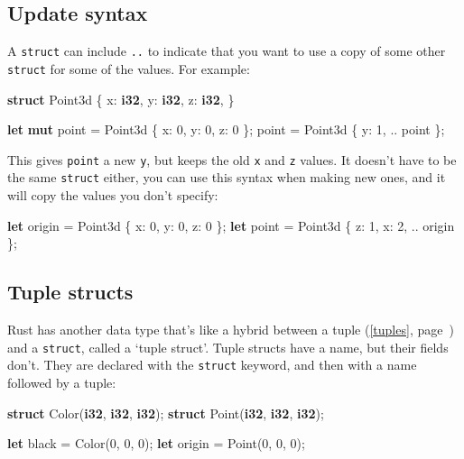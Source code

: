 \documentclass[a4paper,]{book}
\renewcommand*{\hyperref}[2][\ar]{%
  \def\ar{#2}%
  #2 (\autoref{#1}, page~\pageref{#1})}
\newenvironment{Shaded}{\begin{snugshade}}{\end{snugshade}}
\newcommand{\KeywordTok}[1]{\textcolor[rgb]{0.13,0.29,0.53}{\textbf{{#1}}}}
\newcommand{\DecValTok}[1]{\textcolor[rgb]{0.00,0.00,0.81}{{#1}}}
\newcommand{\NormalTok}[1]{{#1}}
\begin{document}
\subsection{Update syntax}\label{update-syntax}

A \texttt{struct} can include \texttt{..} to indicate that you want to
use a copy of some other \texttt{struct} for some of the values. For
example:

\begin{Shaded}
\begin{Highlighting}[]
\KeywordTok{struct} \NormalTok{Point3d \{}
    \NormalTok{x: }\KeywordTok{i32}\NormalTok{,}
    \NormalTok{y: }\KeywordTok{i32}\NormalTok{,}
    \NormalTok{z: }\KeywordTok{i32}\NormalTok{,}
\NormalTok{\}}

\KeywordTok{let} \KeywordTok{mut} \NormalTok{point = Point3d \{ x: }\DecValTok{0}\NormalTok{, y: }\DecValTok{0}\NormalTok{, z: }\DecValTok{0} \NormalTok{\};}
\NormalTok{point = Point3d \{ y: }\DecValTok{1}\NormalTok{, .. point \};}
\end{Highlighting}
\end{Shaded}

This gives \texttt{point} a new \texttt{y}, but keeps the old \texttt{x}
and \texttt{z} values. It doesn't have to be the same \texttt{struct}
either, you can use this syntax when making new ones, and it will copy
the values you don't specify:

\begin{Shaded}
\begin{Highlighting}[]
\KeywordTok{let} \NormalTok{origin = Point3d \{ x: }\DecValTok{0}\NormalTok{, y: }\DecValTok{0}\NormalTok{, z: }\DecValTok{0} \NormalTok{\};}
\KeywordTok{let} \NormalTok{point = Point3d \{ z: }\DecValTok{1}\NormalTok{, x: }\DecValTok{2}\NormalTok{, .. origin \};}
\end{Highlighting}
\end{Shaded}

\subsection{Tuple structs}\label{tuple-structs}

Rust has another data type that's like a hybrid between a
\hyperref[tuples]{tuple} and a \texttt{struct}, called a `tuple struct'.
Tuple structs have a name, but their fields don't. They are declared
with the \texttt{struct} keyword, and then with a name followed by a
tuple:

\begin{Shaded}
\begin{Highlighting}[]
\KeywordTok{struct} \NormalTok{Color(}\KeywordTok{i32}\NormalTok{, }\KeywordTok{i32}\NormalTok{, }\KeywordTok{i32}\NormalTok{);}
\KeywordTok{struct} \NormalTok{Point(}\KeywordTok{i32}\NormalTok{, }\KeywordTok{i32}\NormalTok{, }\KeywordTok{i32}\NormalTok{);}

\KeywordTok{let} \NormalTok{black = Color(}\DecValTok{0}\NormalTok{, }\DecValTok{0}\NormalTok{, }\DecValTok{0}\NormalTok{);}
\KeywordTok{let} \NormalTok{origin = Point(}\DecValTok{0}\NormalTok{, }\DecValTok{0}\NormalTok{, }\DecValTok{0}\NormalTok{);}
\end{Highlighting}
\end{Shaded}
\end{document}
